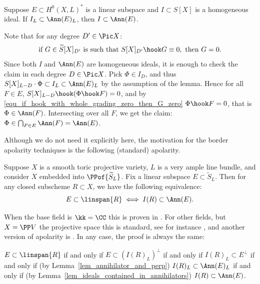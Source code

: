 \documentclass[12pt,a4paper]{article}
\begin{document}
\begin{lemma}\label{lem_ideals_contained_in_annihilators}
   Suppose $E\subset H^0(X,L)^*$ is a linear subspace and
   $I \subset S[X]$ is a homogeneous ideal.
    If $I_L \subset \Ann(E)_L$, then $I \subset \Ann(E)$.
\end{lemma}
\begin{prf}
  Note that for any degree $D'\in \Pic X$:
  \begin{equation}\label{equ_if_hook_with_whole_grading_zero_then_G_zero}
     \text{if }
     G\in \widetilde{S}[X]_{D'}
   \text{ is such that } S[X]_{D'}\hook G \equiv 0, \text{ then } G = 0.
  \end{equation}
  Since both $I$ and $\Ann(E)$ are homogeneous ideals,
    it is enough to check the claim in each degree
    $D\in \Pic X $.
  Pick $\Phi\in I_{D}$, and thus $S[X]_{L-D} \cdot \Phi \subset I_{L} \subset \Ann(E)_{L}$ by the assumption of the lemma.
   Hence for all $F\in E$,
   $S[X]_{L-D} \hook (\Phi \hook F) =0$,
   and by \eqref{equ_if_hook_with_whole_grading_zero_then_G_zero}   $\Phi \hook F =0$, that is $\Phi \in \Ann(F)$.
   Intersecting over all $F$, we get the claim:
   $\Phi\in \bigcap_{F\in E} \Ann(F) = \Ann (E)$.
\end{prf}

Although we do not need it explicitly here, the motivation for the border apolarity techniques is the following (standard) apolarity.


\begin{prop}
   \label{prop_multigraded_apolarity}
   Suppose $X$ is a smooth toric projective variety, $L$ is a very ample line bundle, and consider $X$ embedded into $\PPof{\widetilde{S}_L}$.
   Fix a linear subspace $E\subset \widetilde{S}_L$.
   Then for any closed subscheme $R\subset X$, we have the following equivalence:
   \[
     E\subset \linspan{R} \iff I(R)\subset \Ann(E).
   \]
\end{prop}
When the base field is $\kk=\CC$ this is proven in \cite[Thm~1.4]{galazka_mgr_publ}.
For other fields,  but  $X=\PP V$ the projective space this is standard, see for instance
\cite[Lem.~1.15]{iarrobino_kanev_book_Gorenstein_algebras},
and another version of apolarity is \cite[Prop.~4.14]{nisiabu_jabu_farnik_cactus_Fujita}.
In any case, the proof is always the same:
\begin{prf}
  $E\subset \linspan{R}$ if and only if $E\subset (I(R)_L)^{\perp}$ if and only if $I(R)_L \subset E^{\perp}$ if and only if
  (by Lemma~\ref{lem_annihilator_and_perp}) $I(R)_L \subset \Ann(E)_L$ if and only if
  (by Lemma~\ref{lem_ideals_contained_in_annihilators}) $I(R) \subset \Ann(E)$.
\end{prf}
\end{document}

